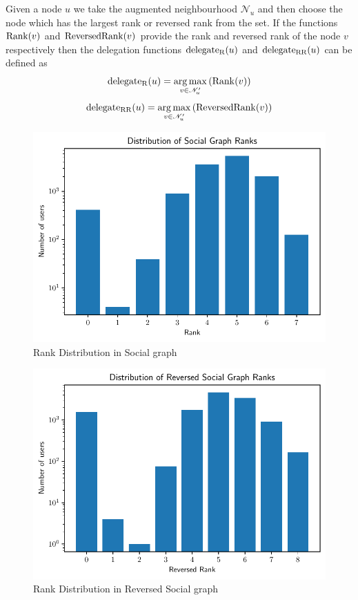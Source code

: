 Given a node $u$ we take the augmented neighbourhood $\mathcal{N}_u$ and then choose the node which has the largest rank or reversed rank from the set. If the functions $\operatorname*{Rank}(v)$ and $\operatorname*{ReversedRank}(v)$ provide the rank and reversed rank of the node $v$ respectively then the delegation functions $\operatorname*{delegate_R}(u)$ and $\operatorname*{delegate_{RR}}(u)$ can be defined as 
\[\operatorname*{delegate_R}(u)  = \operatorname*{arg\,max}_{v \in \mathcal{N}_u^\prime} \left(\operatorname*{Rank}(v) \right)\]
\[\operatorname*{delegate_{RR}}(u)  = \operatorname*{arg\,max}_{v \in \mathcal{N}_u^\prime} \left(\operatorname*{ReversedRank}(v) \right)\]

\begin{figure}[!ht]
    \centering
    \includegraphics[width=\linewidth]{images/Rank dist.pdf}
    \caption{Rank Distribution in Social graph}
    \label{fig:rank}
\end{figure}
\begin{figure}[!ht]
    \centering
    \includegraphics[width=\linewidth]{images/Reversed Rank dist.pdf}
    \caption{Rank Distribution in Reversed Social graph}
    \label{fig:reversed-rank}
\end{figure}


